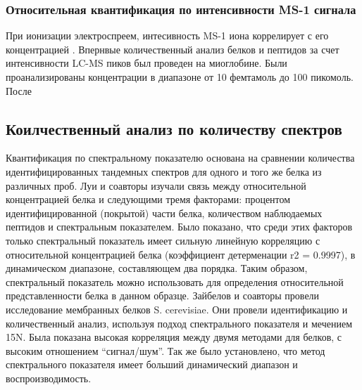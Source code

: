 \subsubsection{Относительная квантификация по интенсивности MS-1 сигнала}
При ионизации электроспреем, интесивность MS-1 иона коррелирует с его концентрацией \cite{voyksner1999investigating}. 
Впернвые количественный анализ белков и пептидов за счет интенсивности LC-MS пиков был проведен на миоглобине. Были проанализированы концентрации в диапазоне от 10 фемтамоль до 100 пикомоль.
После 

\subsection{Коилчественный анализ по количеству спектров}
Квантификация по спектральному показателю основана на сравнении количества идентифицированных тандемных спектров для одного и того же белка из различных проб. Луи и соавторы изучали связь между относительной концентрацией белка и следующими тремя факторами: процентом идентифицированной (покрытой) части белка, количеством наблюдаемых пептидов и спектральным показателем. Было показано, что среди этих факторов только спектральный показатель имеет сильную линейную корреляцию с относительной концентрацией белка (коэффициент детерменации r2 = 0.9997), в динамическом диапазоне, составляющем два порядка. Таким образом, спектральный показатель можно использовать для определения относительной представленности белка в данном образце. Зайбелов и соавторы провели исследование мембранных белков S. cerevisiae. Они провели идентификацию и количественный анализ, используя подход спектрального показателя и мечением 15N. Была показана высокая корреляция между двумя методами для белков, с высоким отношением “сигнал/шум”. Так же было установлено, что метод спектрального показателя имеет больший  динамический диапазон и воспроизводимость.

\newpage
